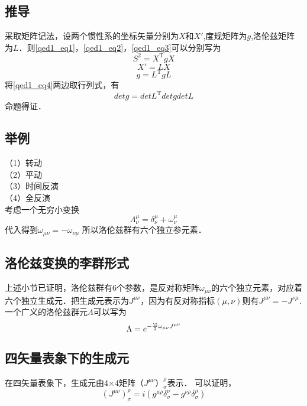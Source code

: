 \subsection{推导}
采取矩阵记法，设两个惯性系的坐标矢量分别为$X$和$X'$,度规矩阵为$g$,洛伦兹矩阵为$L$．则\autoref{qed1_eq1}，\autoref{qed1_eq2}，\autoref{qed1_eq3}可以分别写为
\begin{equation}
S^{2}=X^{\mathrm{T}} g X
\end{equation}
\begin{equation}
X'=LX
\end{equation}
\begin{equation}\label{qed1_eq4}
g=L^{\mathrm{T}} g L
\end{equation}
将\autoref{qed1_eq4}两边取行列式，有
\begin{equation}
detg=detL^{\mathrm{T}} detg detL
\end{equation}
命题得证．
\subsection{举例}
（1）转动\\
（2）平动\\
（3）时间反演\\
（4）全反演\\
考虑一个无穷小变换
\begin{equation}\Lambda_{\nu}^{\mu}=\delta_{\nu}^{\mu}+\omega_{\nu}^{\mu}\end{equation}
代入得到$\omega_{\mu \nu}=-\omega_{\nu \mu}$
所以洛伦兹群有六个独立参元素．
\subsection{洛伦兹变换的李群形式}
上述小节已证明，洛伦兹群有6个参数，是反对称矩阵$\omega_{\mu\nu}$的六个独立元素，对应着六个独立生成元．把生成元表示为$J^{\mu\nu}$，因为有反对称指标$(\mu,\nu)$则有$J^{\mu\nu}=-J^{\nu\mu}$.一个广义的洛伦兹群元$\Lambda$可以写为
\begin{equation}
\Lambda=e^{-\frac{\I}{2} \omega_{\mu\nu}J^{\mu\nu}}
\end{equation}
\subsection{四矢量表象下的生成元}
在四矢量表象下，生成元由4×4矩阵$（J^{\mu\nu}）_\sigma^\rho$表示．
可以证明，
\begin{equation}\left(J^{\mu \nu}\right)_{\sigma}^{\rho}=i\left(g^{\mu \rho} \delta_{\sigma}^{\nu}-g^{\nu \rho} \delta_{\sigma}^{\mu}\right)\end{equation}
